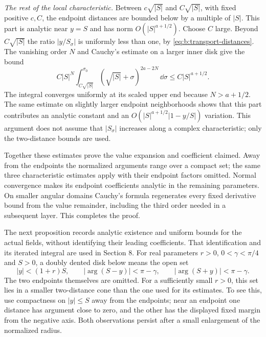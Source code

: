 \begin{prf}
\smallskip\noindent
\emph{The rest of the local characteristic.}
Between $c\sqrt{|S|}$ and $C\sqrt{|S|}$, with fixed positive
$c,C$, the endpoint distances are bounded below by a multiple of
$|S|$. This part is analytic near $y=S$ and has norm
$O(|S|^{a+1/2})$. Choose $C$ large. Beyond $C\sqrt{|S|}$ the
ratio $|y/S_\sigma|$ is uniformly less than one, by
\eqref{eq:b:transport-distances}. The vanishing order $N$ and
Cauchy's estimate on a larger inner disk give the bound
\begin{equation}\label{eq:b:intermediate-transport}
 C|S|^N\int_{C\sqrt{|S|}}^{\sigma_0}
                    (\sqrt{|S|}+\sigma)^{2a-2N}\,\dd\sigma
                 \leq C|S|^{a+1/2}.
\end{equation}
The integral converges uniformly at its scaled upper end because
$N>a+1/2$. The same estimate on slightly larger endpoint
neighborhoods shows that this part contributes an analytic constant
and an $O(|S|^{a+1/2}|1-y/S|)$ variation.
This argument does not assume that $|S_\sigma|$ increases along a
complex characteristic; only the two-distance bounds are used.

Together these estimates prove the value expansion and coefficient
claimed. Away from the endpoints the normalized arguments range over
a compact set; the same three characteristic estimates apply with
their endpoint factors omitted. Normal convergence makes its endpoint
coefficients analytic
in the remaining parameters. On smaller angular domains Cauchy's
formula regenerates every fixed derivative bound from the value
remainder, including the third order needed in a subsequent layer.
This completes the proof.
\end{prf}

The next proposition records analytic existence and uniform bounds
for the actual fields, without identifying their leading coefficients.
That identification and its iterated integral are used in Section 8.
For real parameters $r>0$, $0<\gamma<\pi/4$ and $S>0$,
a doubly dented disk below means the open set
\begin{equation}\label{eq:b:dented-disk}
 |y|<(1+r)S,\qquad
 |\arg(S-y)|<\pi-\gamma,\qquad
 |\arg(S+y)|<\pi-\gamma.
\end{equation}
The two endpoints themselves are omitted. For a sufficiently small
$r>0$, this set lies in a smaller two-distance cone than
the one used for its estimates. To see this, use compactness on
$|y|\leq S$ away from the endpoints; near an endpoint one distance
has argument close to zero, and the other has the displayed fixed
margin from the negative axis. Both observations persist after a
small enlargement of the normalized radius.

